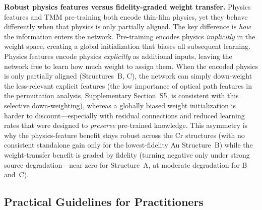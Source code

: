\documentclass[a4paper,fleqn]{cas-sc}
\begin{document}
\textbf{Robust physics features versus fidelity-graded weight transfer.} Physics features and TMM pre-training both encode thin-film physics, yet they behave differently when that physics is only partially aligned. The key difference is \emph{how} the information enters the network. Pre-training encodes physics \emph{implicitly} in the weight space, creating a global initialization that biases all subsequent learning. Physics features encode physics \emph{explicitly} as additional inputs, leaving the network free to learn how much weight to assign them. When the encoded physics is only partially aligned (Structures~B, C), the network can simply down-weight the less-relevant explicit features (the low importance of optical path features in the permutation analysis, Supplementary Section~S5, is consistent with this selective down-weighting), whereas a globally biased weight initialization is harder to discount---especially with residual connections and reduced learning rates that were designed to \emph{preserve} pre-trained knowledge. This asymmetry is why the physics-feature benefit stays robust across the Cr structures (with no consistent standalone gain only for the lowest-fidelity Au Structure~B) while the weight-transfer benefit is graded by fidelity (turning negative only under strong source degradation---near zero for Structure~A, at moderate degradation for B and~C).

\subsection{Practical Guidelines for Practitioners}
\label{sec:guidelines}
\end{document}
